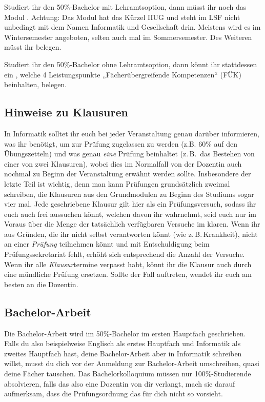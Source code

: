 Studiert ihr den 50\%-Bachelor mit Lehramtsoption, dann müsst ihr noch das Modul . Achtung: Das Modul hat das Kürzel IIUG und steht im LSF nicht unbedingt mit dem Namen Informatik und Gesellschaft drin. Meistens wird es im Wintersemester angeboten, selten auch mal im Sommersemester. Des Weiteren müsst ihr  belegen.

Studiert ihr den 50\%-Bachelor ohne Lehramtsoption, dann könnt ihr stattdessen ein , welche 4 Leistungspunkte „Fächerübergreifende Kompetenzen“ (FÜK) beinhalten, belegen.

\subsection{Hinweise zu Klausuren}
In Informatik solltet ihr euch bei jeder Veranstaltung genau darüber informieren, was ihr benötigt, um zur Prüfung zugelassen zu werden (z.B. 60\% auf den Übungszetteln) und was genau \emph{eine} Prüfung beinhaltet (z.\,B.\ das Bestehen von einer von zwei Klausuren), wobei dies im Normalfall von der Dozentin auch nochmal zu Beginn der Veranstaltung erwähnt werden sollte. Insbesondere der letzte Teil ist wichtig, denn man kann Prüfungen grundsätzlich zweimal schreiben, die Klausuren aus den Grundmodulen zu Beginn des Studiums sogar vier mal. Jede geschriebene Klausur gilt hier als ein Prüfungsversuch, sodass ihr euch auch frei aussuchen könnt, welchen davon ihr wahrnehmt, seid euch nur im Voraus über die Menge der tatsächlich verfügbaren Versuche im klaren. Wenn ihr aus Gründen, die ihr nicht selbst verantworten könnt (wie z.\,B.\,Krankheit), nicht an einer \emph{Prüfung} teilnehmen könnt und mit Entschuldigung beim Prüfungssekretariat fehlt, erhöht sich entsprechend die Anzahl der Versuche. Wenn ihr alle \emph{Klausur}termine verpasst habt, könnt ihr die Klausur auch durch eine mündliche Prüfung ersetzen. Sollte der Fall auftreten, wendet ihr euch am besten an die Dozentin.

\subsection{Bachelor-Arbeit}
Die Bachelor-Arbeit wird im 50\%-Bachelor im ersten Hauptfach geschrieben. Falls du also beispielweise Englisch als erstes Hauptfach und Informatik als zweites Hauptfach hast, deine Bachelor-Arbeit aber in Informatik schreiben willst, musst du dich vor der Anmeldung zur Bachelor-Arbeit umschreiben, quasi deine Fächer tauschen. Das Bachelorkolloquium müssen nur 100\%-Studierende absolvieren, falls das also eine Dozentin von dir verlangt, mach sie darauf aufmerksam, dass die Prüfungsordnung das für dich nicht so vorsieht.
